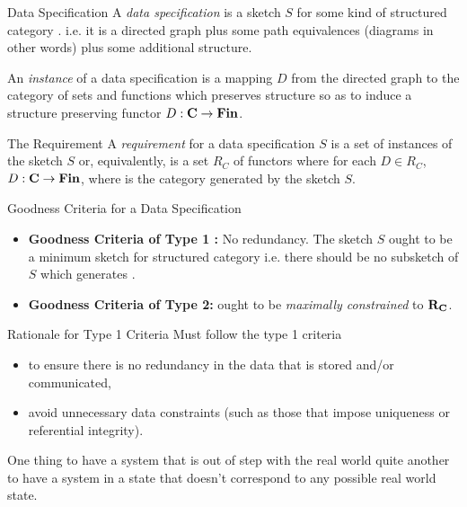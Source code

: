 

\begin{frame}{Data Specification}
A \textit{data specification} is a sketch $S$ for some kind of structured category \catc.
i.e. it is a directed graph plus some path equivalences (diagrams in other words) plus 
some additional structure.  

An \textit{instance} of a data specification is a mapping $D$ from the directed graph
to the category of sets and functions which preserves structure so as
to induce a structure preserving functor $D: \textbf{C} \rightarrow \textbf{Fin}$.
\end{frame}

\begin{frame}{The Requirement}
A \textit{requirement} for a data specification $S$ 
is a set of instances of the sketch $S$ or, equivalently, is a set $R_C$ of functors where for each
$D \in R_C$, $D: \textbf{C} \rightarrow \textbf{Fin}$, where \catcw is the category generated by the sketch $S$.
\end{frame}

\begin{frame}{Goodness Criteria for a Data Specification}
\IfSforCwithRCwordsvariant 
\begin{itemize}
\item 
\textbf {Goodness Criteria of Type 1 :} No redundancy. The sketch $S$ ought to be a minimum sketch for structured category \catcw i.e. there should be no subsketch of $S$ which generates  \catc.
\item
\textbf {Goodness Criteria of Type 2:} \catcw ought to be \textit{maximally constrained} to $\textbf{R}_{\textbf{C}}$.
\end{itemize}
\end{frame}

\begin{frame}{Rationale for Type 1 Criteria}
Must follow the type 1 criteria 
\begin{itemize}
\item to ensure there is no redundancy in the  data that is stored and/or communicated,
\item avoid unnecessary data constraints (such as those that impose uniqueness or referential integrity).
\end{itemize} 
\medskip
One thing to have a system that is out of step with the real world quite another to have a system 
in a state that doesn't correspond to any possible  real world state.
\end{frame}

